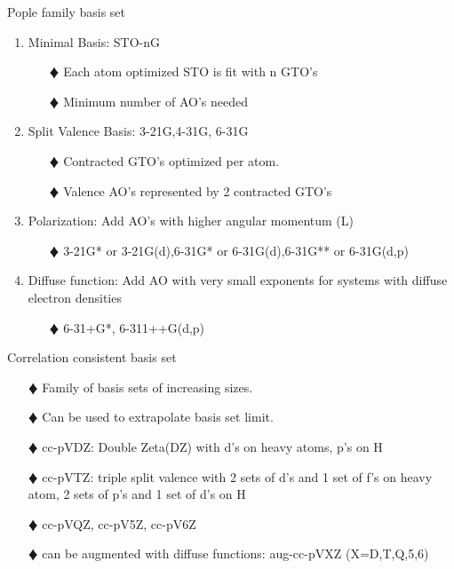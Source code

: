 \documentclass[slidestop,mathserif,compress,xcolor=svgnames]{beamer}
\begin{document}
\begin{frame}
\footnotesize{
\begin{block}{Pople family basis set}
\begin{enumerate}
\item Minimal Basis: STO-nG
\begin{enumerate}
\item[$\vardiamond$]Each atom optimized STO is fit with n GTO's
\item[$\vardiamond$]Minimum number of AO's needed
\end{enumerate}
\item Split Valence Basis: 3-21G,4-31G, 6-31G
\begin{enumerate}
\item[$\vardiamond$]Contracted GTO's optimized per atom.
\item[$\vardiamond$]Valence AO's represented by 2 contracted GTO's
\end{enumerate}
\item Polarization: Add AO's with higher angular momentum (L)
\begin{enumerate}
\item[$\vardiamond$]3-21G* or 3-21G(d),6-31G* or 6-31G(d),6-31G** or 6-31G(d,p)
\end{enumerate}
\item Diffuse function: Add AO with very small exponents for systems with diffuse electron densities
\begin{enumerate}
\item[$\vardiamond$]6-31+G*, 6-311++G(d,p)
\end{enumerate}
\end{enumerate}
\end{block}
}
\end{frame}

\begin{frame}
\footnotesize{
\begin{block}{Correlation consistent basis set}
\begin{enumerate}
\item[$\vardiamond$]Family of basis sets of increasing sizes.
\item[$\vardiamond$]Can be used to extrapolate basis set limit.
\item[$\vardiamond$]cc-pVDZ: Double Zeta(DZ) with d's on heavy atoms, p's on H
\item[$\vardiamond$]cc-pVTZ: triple split valence with 2 sets of d's and 1 set of f's on heavy atom, 2 sets of p's and 1 set of d's on H
\item[$\vardiamond$]cc-pVQZ, cc-pV5Z, cc-pV6Z
\item[$\vardiamond$]can be augmented with diffuse functions: aug-cc-pVXZ (X=D,T,Q,5,6)
\end{enumerate}
\end{block}
}
\end{frame}
\end{document}
